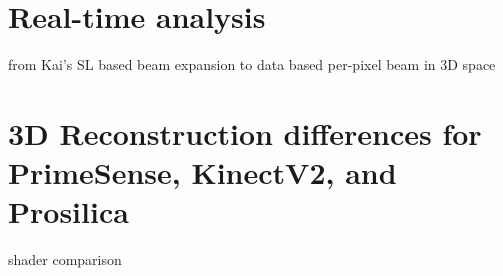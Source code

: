 \section{Real-time analysis}
from Kai's SL based beam expansion to data based per-pixel beam in 3D space

\section{3D Reconstruction differences for PrimeSense, KinectV2, and Prosilica}
shader comparison
%
%
%
%
%
%
%
































